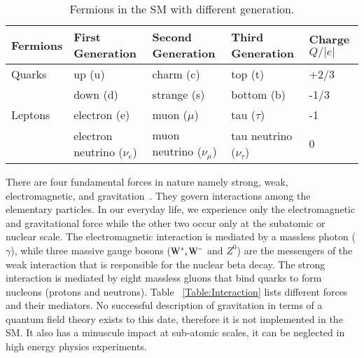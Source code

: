 \begin{table}
\caption{\small{Fermions in the SM with different generation.}}
\begin{center}
    \begin{tabular}{ | l | l | l |l| p{1.5cm}|}
    \hline
     {\bf Fermions}  &  {\bf First Generation} & {\bf Second Generation}  & {\bf Third Generation} & {\bf Charge $Q/|e|$}  \\ \hline \hline
     Quarks & up (u)  & charm (c) & top (t) & +2/3 \\
            & down (d)& strange (s) & bottom (b) &-1/3 \\ \hline
     Leptons & electron (e) & muon ($\mu$) & tau ($\tau$) &  -1 \\ 
             & electron neutrino ($\nu_e$) & muon neutrino ($\nu_\mu$) & tau neutrino ($\nu_\tau$) &  0 \\ \hline 
             \end{tabular}
             \label{Table:Fermions in SM}
    \end{center}     
\end{table}
There are four fundamental forces in nature namely strong, weak, electromagnetic, and gravitation~\cite{particle physics}. They govern interactions among the elementary particles. In our everyday life, we experience only the electromagnetic and gravitational force while the other two occur only at the subatomic or nuclear scale. The electromagnetic interaction is mediated by a massless photon ($\gamma$), while three massive gauge bosons ($\rm W^+, W^-$ and $Z^0 $) are the messengers of the weak interaction that is responsible for the nuclear beta decay. The strong interaction is mediated by eight massless gluons that bind quarks to form nucleons (protons and neutrons). Table ~\ref{Table:Interaction} lists different forces and their mediators. No successful description of gravitation in terms of a quantum field theory exists to this date, therefore it is not implemented in the SM. It also has a  minuscule impact at sub-atomic scales, it can be neglected in high energy physics experiments.


